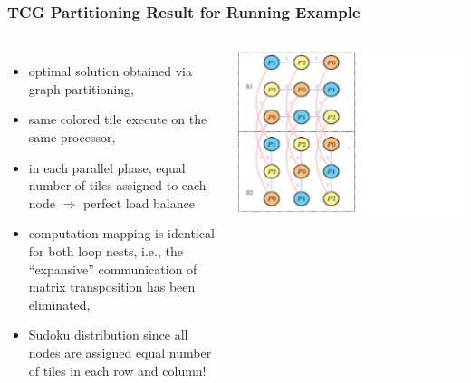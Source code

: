 \documentclass{beamer}
\newcommand{\emp}[1]{\textcolor{DikuRed}{ #1}}
\begin{document}
\begin{frame}[fragile,t]
  \frametitle{TCG Partitioning Result for Running Example}


\begin{columns}
\begin{itemize}
    \item optimal solution obtained via graph partitioning,
    \item same colored tile execute on the same processor,
    \item in each parallel phase, equal number of tiles
            assigned to each node $\Rightarrow$ perfect 
            load balance
    \item computation mapping is identical for both loop nests,
            i.e., the ``expansive'' communication of
            matrix transposition has been eliminated,
    \item \emp{Sudoku} distribution since all nodes are assigned
            equal number of tiles in each row and column! 
\end  {itemize}
\includegraphics[width=59ex]{ParTeaserFigs/TCGresultADI}
\end{columns}

\end{frame}
\end{document}
